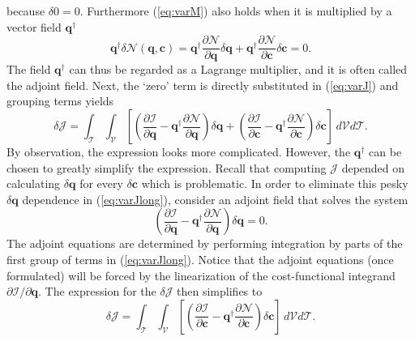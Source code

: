 because $\delta 0=0$. Furthermore (\ref{eq:varM}) also holds when it is multiplied by a vector field $\mathbf{q}^\dagger$
\begin{equation}
    \mathbf{q}^\dagger\delta \mathcal{N}(\mathbf{q},\mathbf{c})= \mathbf{q}^\dagger\frac{\partial \mathcal{N}}{\partial \mathbf{q}}\delta \mathbf{q} + \mathbf{q}^\dagger\frac{\partial \mathcal{N}}{\partial \mathbf{c}}\delta \mathbf{c} = 0.
\end{equation}
The field $\mathbf{q}^\dagger$ can thus be regarded as a Lagrange multiplier, and it is often called the adjoint field.
Next, the `zero' term is directly substituted in (\ref{eq:varJ}) and grouping terms yields
\begin{equation}\label{eq:varJlong}
\delta \mathcal{J} = {\int}_\mathcal{\!\!T} {\int}_\mathcal{\!\!V}\left[ \left( \frac{\partial \mathcal{I}}{\partial \mathbf{q}}  - \mathbf{q}^\dagger \frac{\partial \mathcal{N}}{\partial \mathbf{q}} \right) \delta \mathbf{q}+\left(\frac{\partial \mathcal{I}}{\partial \mathbf{c}}  -\mathbf{q}^\dagger\frac{\partial \mathcal{N}}{\partial \mathbf{c}} \right) \delta \mathbf{c} \right]\,d\mathcal{V} d\mathcal{T}.
\end{equation}
By observation, the expression looks more complicated. However, the $\mathbf{q}^\dagger$ can be chosen to greatly simplify the expression.  Recall that computing $\mathcal{J}$ depended on calculating $\delta \mathbf{q}$ for every $\delta \mathbf{c}$ which is problematic.  In order to eliminate this pesky $\delta \mathbf{q}$ dependence in (\ref{eq:varJlong}), consider an adjoint field that solves the system
\begin{equation}\label{eq:adjointbeforeIBP}
 \left( \frac{\partial \mathcal{I}}{\partial \mathbf{q}}  - \mathbf{q}^\dagger \frac{\partial \mathcal{N}}{\partial \mathbf{q}} \right) \delta \mathbf{q}=0.
\end{equation}
The adjoint equations are determined by performing integration by parts of the first group of terms in (\ref{eq:varJlong}). Notice that the adjoint equations (once formulated) will be forced by the linearization of the cost-functional integrand $\partial \mathcal{I}/\partial \mathbf{q}$. The expression for the $\delta \mathcal{J}$ then simplifies to
\begin{equation}\label{eq:sensitivity}
    \delta \mathcal{J} = {\int}_\mathcal{\!\!T} {\int}_\mathcal{\!\!V}\left[ \left(\frac{\partial \mathcal{I}}{\partial \mathbf{c}}  -\mathbf{q}^\dagger\frac{\partial \mathcal{N}}{\partial \mathbf{c}} \right) \delta \mathbf{c} \right]\,d\mathcal{V} d\mathcal{T}.
\end{equation}
